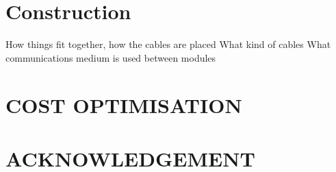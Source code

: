 \documentclass[11pt]{witseiepaper}
\begin{document}











\section{Construction} \label{sec:Construction}

How things fit together, how the cables are placed
What kind of cables
What communications medium is used between modules



\section{COST OPTIMISATION} \label{sec:COSTOPTIMISATION}




\section*{ACKNOWLEDGEMENT} \label{sec:ACKNOWLEDGEMENT}


\end{document}
